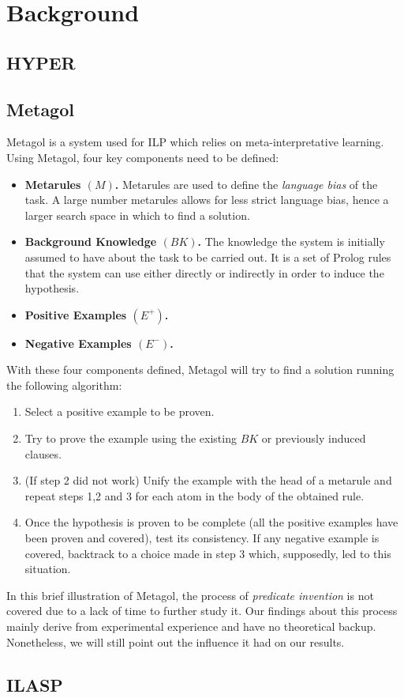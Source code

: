 \section{Background}\label{sec:back}

\subsection{HYPER}
\subsection{Metagol}
Metagol is a system used for ILP which relies on meta-interpretative learning.\\
Using Metagol, four key components need to be defined:
\begin{itemize}
    \item \textbf{Metarules \((M)\).} Metarules are used to define the \emph{language bias} of the task. A large number metarules allows for less strict language bias, hence a larger search space in which to find a solution. 
    \item \textbf{Background Knowledge \((BK)\).} The knowledge the system is initially assumed to have about the task to be carried out. It is a set of Prolog rules that the system can use either directly or indirectly in order to induce the hypothesis.
    \item \textbf{Positive Examples \((E^+)\).}
    \item \textbf{Negative Examples \((E^-)\).}
\end{itemize}
With these four components defined, Metagol will try to find a solution running the following algorithm:
\begin{enumerate}
    \item Select a positive example to be proven.
    \item Try to prove the example using the existing \(BK\) or previously induced clauses.
    \item (If step 2 did not work) Unify the example with the head of a metarule and repeat steps 1,2 and 3 for each atom in the body of the obtained rule.
    \item Once the hypothesis is proven to be complete (all the positive examples have been proven and covered), test its consistency. If any negative example is covered, backtrack to a choice made in step 3 which, supposedly, led to this situation.
\end{enumerate}
In this brief illustration of Metagol, the process of \emph{predicate invention} is not covered due to a lack of time to further study it. Our findings about this process mainly derive
from experimental experience and have no theoretical backup. Nonetheless, we will still point out the influence it had on our results.


\subsection{ILASP}
